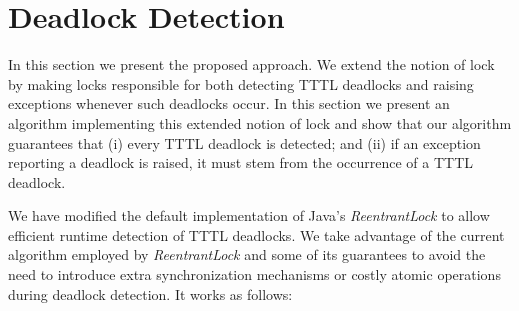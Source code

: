 \section{Deadlock Detection}

In this section we present the proposed approach. We extend the notion of lock by making locks responsible for both detecting TTTL deadlocks and raising exceptions whenever such deadlocks occur. In this section we present an algorithm implementing this extended notion of lock and show that our algorithm guarantees that (i) every TTTL deadlock is detected; and (ii) if an exception reporting a deadlock is raised, it must stem from the occurrence of a TTTL deadlock.

We have modified the default implementation of Java's \emph{ReentrantLock} to allow efficient runtime detection of TTTL deadlocks. We take advantage of the current algorithm employed by \emph{ReentrantLock} and some of its guarantees to avoid the need to introduce extra synchronization mechanisms or costly atomic operations during deadlock detection. It works as follows:


